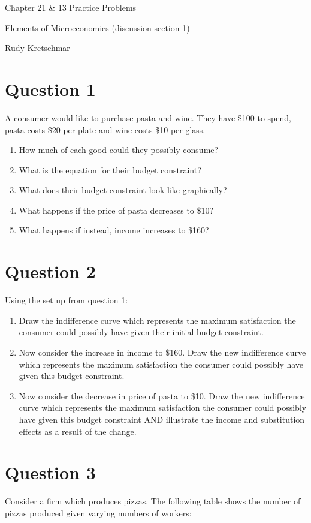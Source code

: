 \documentclass[12pt]{article}
\begin{document}
\begin{center}
\Large Chapter 21 \& 13 Practice Problems

\medskip

\normalsize Elements of Microeconomics (discussion section 1)

\medskip

\small Rudy Kretschmar
\end{center}

\section*{Question 1}
A consumer would like to purchase pasta and wine. They have \$100 to spend, pasta costs \$20 per plate and wine costs \$10 per glass.
\begin{enumerate}
    \item How much of each good could they possibly consume?
    \item What is the equation for their budget constraint?
    \item What does their budget constraint look like graphically?
    \item What happens if the price of pasta decreases to \$10?
    \item What happens if instead, income increases to \$160?
\end{enumerate}

\section*{Question 2}
Using the set up from question 1:
\begin{enumerate}
    \item Draw the indifference curve which represents the maximum satisfaction the consumer could possibly have given their initial budget constraint.
    \item Now consider the increase in income to \$160. Draw the new indifference curve which represents the maximum satisfaction the consumer could possibly have given this budget constraint.
    \item Now consider the decrease in price of pasta to \$10. Draw the new indifference curve which represents the maximum satisfaction the consumer could possibly have given this budget constraint AND illustrate the income and substitution effects as a result of the change. 
\end{enumerate}



\section*{Question 3}
     Consider a firm which produces pizzas. The following table shows the number of pizzas produced given varying numbers of workers:
    
\end{document}
